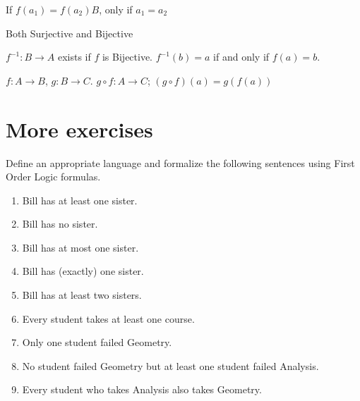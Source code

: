 \begin{definition}[Injective]
  {\color{sol} If $f(a_1) = f(a_2)B$, only if $a_1 = a_2$}
\end{definition}

\begin{definition}[Bijective]
  Both Surjective and Bijective
\end{definition}

\begin{definition}[Inverse]
  {\color{sol} $f^{-1} : B \to A$ exists if $f$ is Bijective. $f^{-1}(b) = a$ if and only if $f(a) = b$.}
\end{definition}

\begin{definition}[Composition]
  $f: A \to B$, $g : B \to C$. $g \circ f : A \to C$; $(g \circ f)(a) = g(f(a))$
\end{definition}

\newpage
\section{More exercises}

\begin{example}
Define an appropriate language and formalize the following sentences using
First Order Logic formulas.\\
\begin{enumerate}
\item Bill has at least one sister.
\item Bill has no sister.
\item Bill has at most one sister.
\item Bill has (exactly) one sister.
\item Bill has at least two sisters.
\item Every student takes at least one course.
\item Only one student failed Geometry.
\item No student failed Geometry but at least one student failed Analysis.
\item Every student who takes Analysis also takes Geometry.
\end{enumerate}
\end{example}

